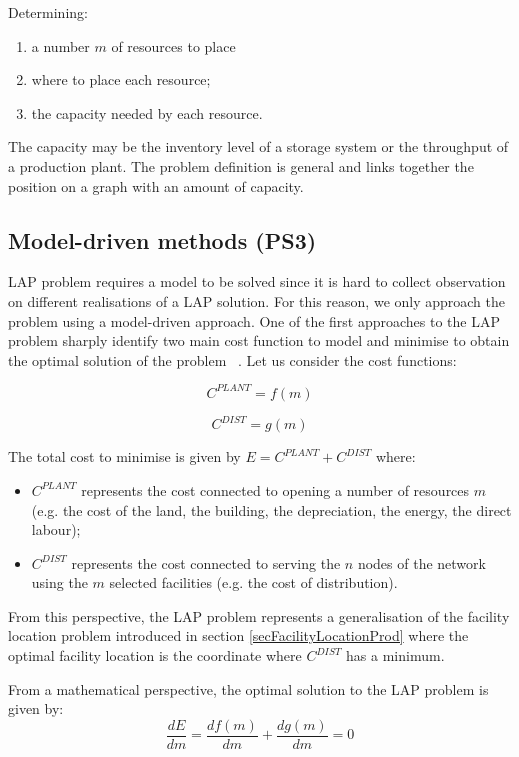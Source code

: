 Determining:

\begin{enumerate}
    \item a number $m$ of resources to place
	\item where to place each resource;
	\item the capacity needed by each resource.

\end{enumerate}

The capacity may be the inventory level of a storage system or the throughput of a production plant. The problem definition is general and links together the position on a graph with an amount of capacity. 
\subsection{Model-driven methods (PS3)}
LAP problem requires a model to be solved since it is hard to collect observation on different realisations of a LAP solution. For this reason, we only approach the problem using a model-driven approach. One of the first approaches to the LAP problem sharply identify two main cost function to model and minimise to obtain the optimal solution of the problem ~\cite{Cooper1963}. Let us consider the cost functions:

\begin{equation}
    C^{PLANT}=f(m)
\end{equation}

\begin{equation}
    C^{DIST}=g(m)
\end{equation}

The total cost to minimise is given by $E=C^{PLANT}+C^{DIST}$ where:

\begin{itemize}
    \item $C^{PLANT}$ represents the cost connected to opening a number of resources $m$ (e.g. the cost of the land, the building, the depreciation, the energy, the direct labour);
    \item $C^{DIST}$ represents the cost connected to serving the $n$ nodes of the network using the $m$ selected facilities (e.g. the cost of distribution).
\end{itemize}

From this perspective, the LAP problem represents a generalisation of the facility location problem introduced in section \ref{secFacilityLocationProd} where the optimal facility location is the coordinate where $C^{DIST}$ has a minimum.\par
From a mathematical perspective, the optimal solution to the LAP problem is given by:
\begin{equation}
    \frac{dE}{dm}=\frac{df(m)}{dm}+\frac{dg(m)}{dm}=0
    \label{eqLAP}
\end{equation}

